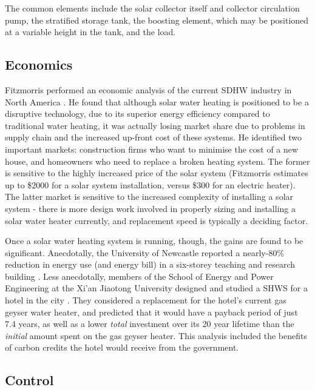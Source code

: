 The common elements include the solar collector itself and collector circulation pump, the stratified storage tank, the boosting element, which may be positioned at a variable height in the tank, and the load.

\subsection{Economics}

Fitzmorris performed an economic analysis of the current SDHW industry in North America \cite{Fitzmorris10}.
He found that although solar water heating is positioned to be a disruptive technology, due to its superior energy efficiency compared to traditional water heating, it was actually losing market share due to problems in supply chain and the increased up-front cost of these systems.
He identified two important markets: construction firms who want to minimise the cost of a new house, and homeowners who need to replace a broken heating system.
The former is sensitive to the highly increased price of the solar system (Fitzmorris estimates up to \$2000 for a solar system installation, versus \$300 for an electric heater).
The latter market is sensitive to the increased complexity of installing a solar system - there is more design work involved in properly sizing and installing a solar water heater currently, and replacement speed is typically a deciding factor.

Once a solar water heating system is running, though, the gains are found to be significant.
Anecdotally, the University of Newcastle reported a nearly-80\% reduction in energy use (and energy bill) in a six-storey teaching and research building \cite{ApricusNewcastle}.
Less anecdotally, members of the School of Energy and Power Engineering at the Xi'an Jiaotong University designed and studied a SHWS for a hotel in the city \cite{Cao14}.
They considered a replacement for the hotel's current gas geyser water heater, and predicted that it would have a payback period of just 7.4 years, as well as a lower {\it total} investment over its 20 year lifetime than the {\it initial} amount spent on the gas geyser heater.
This analysis included the benefits of carbon credits the hotel would receive from the government.


\subsection{Control}

